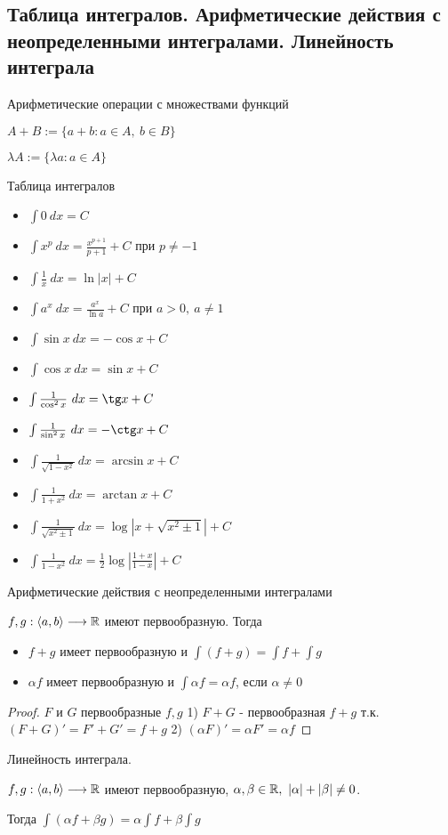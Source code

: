 \subsection{Таблица интегралов. Арифметические действия с неопределенными интегралами. Линейность интеграла \href{https://youtu.be/p9C57KDo1Yg?t=4373}{\Walley}}
\begin{conj}
    Арифметические операции с множествами функций

    $A+B := \{a+b: a \in A,\ b \in B\}$

    $\lambda A := \{ \lambda a : a \in A\}$
\end{conj}

Таблица интегралов

\begin{itemize}
    \item $\int 0\ dx = C$
    \item $\int x^p\ dx = \frac{x^{p+1}}{p+1} + C$ при $p \neq -1$
    \item $\int \frac{1}{x}\ dx = \ln |x| + C$
    \item $\int a^x\ dx = \frac{a^x}{\ln a} + C$ при $a > 0,\ a\neq 1$
    \item $\int \sin x\ dx = -\cos x + C$
    \item $\int \cos x\ dx = \sin x + C$
    \item $\int \frac{1}{\cos^2 x}\ dx = \tg x + C$
    \item $\int \frac{1}{\sin^2 x}\ dx = -\ctg x + C$
    \item $\int \frac{1}{\sqrt{1-x^2}}\ dx = \arcsin x + C$
    \item $\int \frac{1}{1+x^2}\ dx = \arctan x + C$
    \item $\int \frac{1}{\sqrt{x^2\pm 1}}\ dx = \log|x+\sqrt{x^2\pm 1}| + C$
    \item $\int \frac{1}{1-x^2}\ dx = \frac{1}{2}\log |\frac{1+x}{1-x}| + C$   
\end{itemize}

Арифметические действия с неопределенными интегралами

    $f, g: \langle a, b \rangle \longrightarrow \mathbb{R}$ имеют первообразную. Тогда
    \begin{itemize}
        \item $f+g$ имеет первообразную и $\int(f+g) = \int f + \int g$
        \item $\alpha f$ имеет первообразную и $\int \alpha f = \alpha f$, если $\alpha \neq 0$
    \end{itemize}

\begin{proof}
    $F$ и $G$ первообразные $f, g$
    1) $F+G$ - первообразная $f+g$ т.к. $(F+G)'=F'+G'=f+g$
    2) $(\alpha F)' = \alpha F' = \alpha f$
\end{proof}

\follow \; Линейность интеграла.

$f, g: \langle a, b \rangle \longrightarrow \mathbb{R}$ имеют первообразную, $\alpha, \beta \in \mathbb{R},\ |\alpha|+|\beta|\neq 0$.

Тогда $\int (\alpha f + \beta g) = \alpha \int f + \beta \int g$
